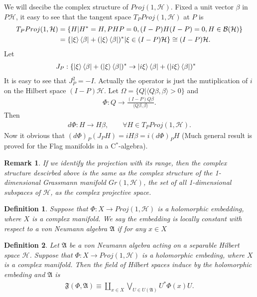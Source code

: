 \documentclass[a4paper,10pt]{amsart}
\newtheorem{definition}{Definition}[section]
\newtheorem{remark}{Remark}[section]
\newcommand{\AAA}{\mathfrak A}
\newcommand{\BBB}{\mathcal B}
\newcommand{\F}{\mathfrak F}
\newcommand{\HHH}{\mathcal H} %
\begin{document}
We will dsecibe the complex structure of $Proj(1, \HHH)$. 
Fixed a unit vector $\beta$ in $P\HHH$,
it easy to see that the tangent space $T_{P}Proj(1, \HHH)$ at $P$ is 
\begin{align*}
    T_{P}Proj(1, \HHH) &=
    \{H | H^{*}=H, PHP = 0, (I-P)H(I-P)=0, H \in \BBB(\HHH)\} \\
    & = \{\Ket{\xi}\Bra{\beta} + (\Ket{\xi}\Bra{\beta})^{*} 
    | \xi \in (I-P)\HHH \}
    \cong (I-P)\HHH.
\end{align*}
Let
\begin{align*}
    J_{P}: \{\Ket{\xi}\Bra{\beta} + (\Ket{\xi}\Bra{\beta})^{*} 
    &\rightarrow \Ket{i \xi}\Bra{\beta} + (\Ket{i \xi}\Bra{\beta})^{*}
\end{align*}
It is easy to see that $J_{P}^{2} = -I$. Actually the operator is just
the mutiplication of $i$ on the Hilbert space $(I-P)\HHH$.
Let $\Omega = \{Q | \langle Q\beta, \beta \rangle > 0\}$ and 
\begin{align*}
    \Phi: Q \rightarrow \frac{(I-P)Q\beta}{\langle Q\beta, \beta \rangle}. 
\end{align*}
Then
\begin{align*}
    d\Phi: H \rightarrow H\beta, \qquad \forall H \in T_{P}Proj(1, \HHH).
\end{align*}
Now it obvious that $(d\Phi)_{P}(J_{P}H) = iH\beta = i(d\Phi)_{P}H$
(Much general result is proved for the Flag manifolds in a C$^*$-algebra). 

\begin{remark}
    If we identify the projection with its range, then the complex
    structure descirbed above is the same as the complex structure of
    the 1-dimensional Grassmann manifold $Gr(1,\HHH)$,
    the set of all 1-dimensional subspaces of $\HHH$, as the
    complex projective space.
\end{remark}

\begin{definition}
   Suppose that $\Phi: X \rightarrow Proj(1, \HHH)$ is a 
   holomorphic embedding, where $X$ is a complex manifold. 
   We say the embedding is locally constant with respect to
   a von Neumann algebra $\AAA$ if for any $x \in X$
\end{definition}

\begin{definition} \label{def_f_2}
   Let $\AAA$ be a von Neumann algebra acting on a separable Hilbert space
   $\HHH$. Suppose that $\Phi: X \rightarrow Proj(1, \HHH)$ is a 
   holomorphic embeding, where $X$ is a complex manifold. Then
   the field of Hilbert spaces induce by the holomorphic embeding
   and $\AAA$ is 
   \begin{align*}
       \F(\Phi, \AAA) \equiv 
       \amalg_{x \in X} \bigvee_{U \in U(\AAA)}U^{*}\Phi(x)U.  
   \end{align*}
\end{definition}
\end{document}
